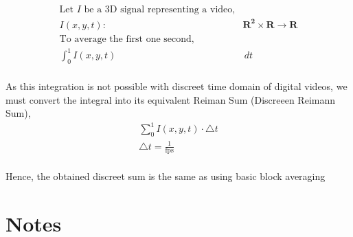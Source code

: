 \documentclass[a4paper,12pt]{article}
\begin{document}
\[
\begin{aligned}
\text{Let } I \text{ be a 3D signal representing a video,} \\
I(x, y, t): & \mathbf{R^2} \times \mathbf{R} \rightarrow \mathbf{R} \\
\text{To average the first one second, } \\
\int_{0}^{1} I(x, y, t) & \, dt  \\
\end{aligned}
\]

As this integration is not possible with discreet time domain of digital videos, we must convert the integral into its equivalent Reiman Sum (Discreeen Reimann Sum),
\[
\begin{aligned}
\sum_{0}^{1} I(x, y, t) \cdot \triangle t \\
\triangle t = \frac{1}{\text{fps}} \\
\end{aligned}
\]

Hence, the obtained discreet sum is the same as using basic block averaging


\section{Notes}
\end{document}
